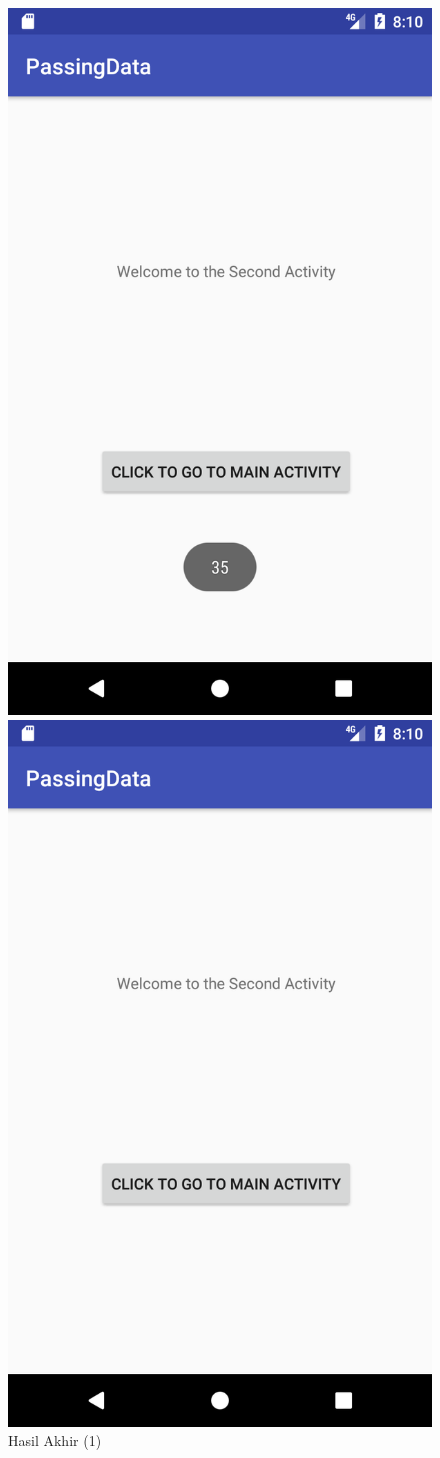\documentclass{scrartcl}
\begin{document}
\begin{enumerate}
	\begin{figure}[htbp]
		\begin{minipage}{.5\textwidth}
			\centering
			\includegraphics[width=0.7\linewidth]{Screenshot_1496841050}
			\caption{Hasil Akhir (1)}
			\label{fig:screenshot_1496841050}
		\end{minipage}
		\begin{minipage}{.5\textwidth}
			\centering
			\includegraphics[width=0.7\linewidth]{Screenshot_1496841052}

\end{minipage}
\end{figure}
\end{enumerate}
\end{document}
